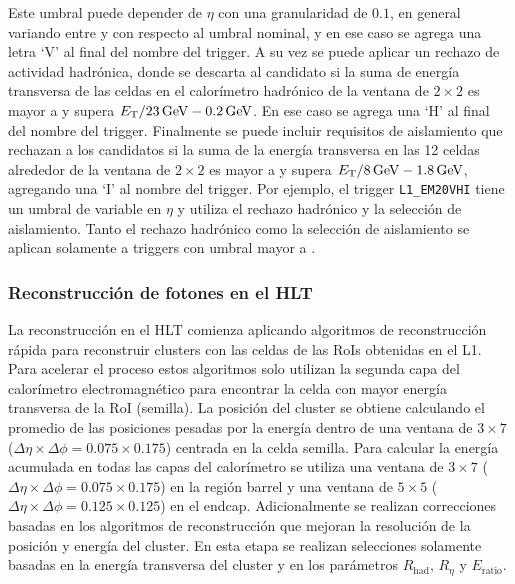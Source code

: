 Este umbral puede depender de $\eta$ con una granularidad de $0.1$, en general variando entre  y  con respecto al umbral nominal, y en ese caso se agrega una letra `V' al final del nombre del trigger. A su vez se puede aplicar un rechazo de actividad hadrónica, donde se descarta al candidato si la suma de energía transversa de las celdas en el calorímetro hadrónico de la ventana de $2\times2$ es mayor a  y supera $E_{\text{T}}/23\,\text{GeV}-0.2\,\text{GeV}$. En ese caso se agrega una `H' al final del nombre del trigger. Finalmente se puede incluir requisitos de aislamiento que rechazan a los candidatos si la suma de la energía transversa en las 12 celdas alrededor de la ventana de $2\times2$ es mayor a  y supera $E_{\text{T}}/8\,\text{GeV}-1.8\,\text{GeV}$, agregando una `I' al nombre del trigger. Por ejemplo, el trigger \texttt{L1\_EM20VHI} tiene un umbral de  variable en $\eta$ y utiliza el rechazo hadrónico y la selección de aislamiento. Tanto el rechazo hadrónico como la selección de aislamiento se aplican solamente a triggers con umbral mayor a .

\subsubsection{Reconstrucción de fotones en el HLT}

La reconstrucción en el HLT comienza aplicando algoritmos de reconstrucción rápida para reconstruir clusters con las celdas de las RoIs obtenidas en el L1. Para acelerar el proceso estos algoritmos solo utilizan la segunda capa del calorímetro electromagnético para encontrar la celda con mayor energía transversa de la RoI (semilla). La posición del cluster se obtiene calculando el promedio de las posiciones pesadas por la energía
dentro de una ventana de $3\times7$ ($\Delta\eta\times\Delta\phi = 0.075\times0.175$) centrada en la celda semilla. Para calcular la energía acumulada 
en todas las capas del calorímetro
se utiliza una ventana de $3\times7$ ($\Delta\eta\times\Delta\phi = 0.075\times0.175$) en la región barrel y una ventana de $5\times5$ ($\Delta\eta\times\Delta\phi = 0.125\times0.125$) en el endcap. Adicionalmente se realizan correcciones basadas en los algoritmos de reconstrucción que mejoran la resolución de la posición y energía del cluster. En esta etapa se realizan selecciones solamente basadas en la energía transversa del cluster y en los parámetros $R_{\text{had}}$, $R_{\eta}$ y $E_{\text{ratio}}$.


